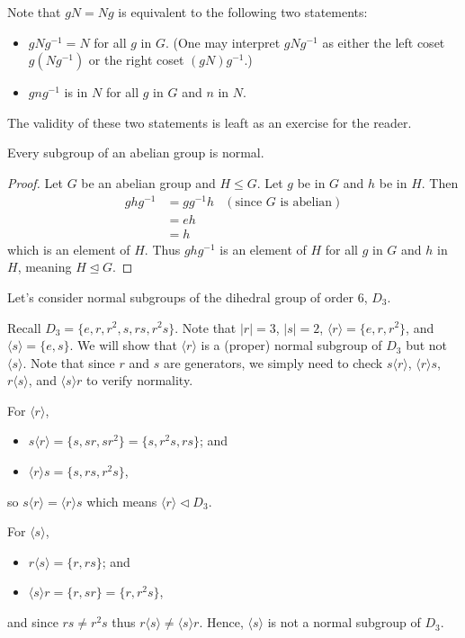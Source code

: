 Note that $gN = Ng$ is equivalent to the following two statements:
\begin{itemize}
    \item $gNg^{-1} = N$ for all $g$ in $G$. (One may interpret $gNg^{-1}$ as either the left coset $g(Ng^{-1})$ or the right coset $(gN)g^{-1}$.)
    \item $gng^{-1}$ is in $N$ for all $g$ in $G$ and $n$ in $N$.
\end{itemize}
The validity of these two statements is leaft as an exercise for the reader.

\begin{proposition}\label{prop-subgroup-of-abelian-group-is-normal}
    Every subgroup of an abelian group is normal.
\end{proposition}
\begin{proof}
    Let $G$ be an abelian group and $H \leq G$. Let $g$ be in $G$ and $h$ be in $H$. Then
    \begin{align*}
        ghg^{-1} &= gg^{-1}h & (\text{since }G \text{ is abelian})\\
        &= eh\\
        &= h
    \end{align*}
    which is an element of $H$. Thus $ghg^{-1}$ is an element of $H$ for all $g$ in $G$ and $h$ in $H$, meaning $H \unlhd G$.
\end{proof}

\begin{example}\label{example-normal-subgroups-of-d3}
    Let's consider normal subgroups of the dihedral group of order 6, $D_3$.

    Recall $D_3 = \{e, r, r^2, s, rs, r^2s\}$. Note that $|r| = 3$, $|s| = 2$, $\langle r \rangle = \{e, r, r^2\}$, and $\langle s \rangle = \{e, s\}$. We will show that $\langle r \rangle$ is a (proper) normal subgroup of $D_3$ but not $\langle s \rangle$. Note that since $r$ and $s$ are generators, we simply need to check $s\langle r\rangle$, $\langle r\rangle s$, $r\langle s\rangle$, and $\langle s\rangle r$ to verify normality.

    \newpage

    For $\langle r \rangle$,
    \begin{itemize}
        \item $s\langle r\rangle = \{s, sr, sr^2\} = \{s, r^2s, rs\}$; and
        \item $\langle r\rangle s = \{s, rs, r^2s\}$,
    \end{itemize}
    so $s\langle r\rangle = \langle r \rangle s$ which means $\langle r \rangle \lhd D_3$.

    For $\langle s \rangle$,
    \begin{itemize}
        \item $r\langle s\rangle = \{r, rs\}$; and
        \item $\langle s \rangle r = \{r, sr\} = \{r, r^2s\}$,
    \end{itemize}
    and since $rs \neq r^2s$ thus $r\langle s\rangle \neq \langle s \rangle r$. Hence, $\langle s \rangle$ is not a normal subgroup of $D_3$.
\end{example}


